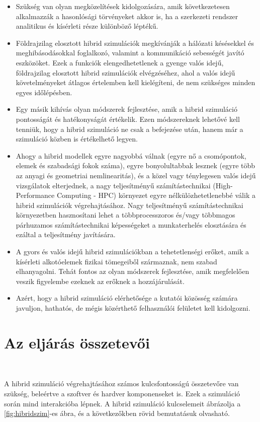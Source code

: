 \begin{itemize}
\item Szükség van olyan  megközelítések kidolgozására, amik következetesen alkalmazzák a hasonlósági törvényeket akkor is, ha a szerkezeti rendszer  analitikus és kísérleti része különböző léptékű.
\item Földrajzilag elosztott hibrid szimulációk megkívánják a hálózati késésekkel és meghibásodásokkal foglalkozó, valamint a kommunikáció sebességét javító eszközöket. Ezek a funkciók elengedhetetlenek a gyenge valós idejű, földrajzilag elosztott hibrid szimulációk elvégzéséhez, ahol a valós idejű követelményeket átlagos értelemben kell kielégíteni, de nem szükséges minden egyes időlépésben. 
\item Egy másik kihívás olyan módszerek fejlesztése, amik a hibrid szimuláció pontosságát  és hatékonyságát értékelik. Ezen módszereknek lehetővé kell tenniük, hogy a hibrid szimuláció ne csak a befejezése után, hanem már a szimuláció közben is értékelhető legyen. 
\item Ahogy a hibrid modellek egyre nagyobbá válnak (egyre nő a csomópontok, elemek és szabadsági fokok száma), egyre bonyolultabbak lesznek (egyre több az anyagi és geometriai nemlinearitás), és a közel vagy ténylegesen valós idejű  vizsgálatok elterjednek, a nagy teljesítményű számítástechnikai  (High-Performance Computing - HPC)  környezet egyre nélkülözhetetlenebbé válik a hibrid szimulációk végrehajtásához. Nagy teljesítményű számítástechnikai környezetben hasznosítani lehet a többprocesszoros és/vagy többmagos párhuzamos számítástechnikai képességeket a munkaterhelés elosztására és ezáltal a teljesítmény javítására. 
\item A gyors és valós idejű hibrid szimulációkban a tehetetlenségi erőket, amik a kísérleti alkotóelemek  fizikai tömegeiből származnak, nem szabad elhanyagolni. Tehát fontos az olyan módszerek fejlesztése, amik megfelelően veszik figyelembe  ezeknek az erőknek a hozzájárulását.
\item Azért, hogy a hibrid szimuláció elérhetősége a kutatói közösség számára javuljon, hathatós, de mégis közérthető felhasználói felületet kell kidolgozni.
\end{itemize}

\section{Az eljárás  összetevői}

{\ }

A hibrid szimuláció végrehajtásához számos kulcsfontosságú összetevőre van szükség, beleértve a szoftver és hardver komponenseket is. Ezek a szimuláció során mind interakcióba lépnek. A hibrid szimuláció kulcselemeit ábrázolja a \ref{fig:hibridszim}-es ábra, és a következőkben rövid bemutatásuk olvasható.

